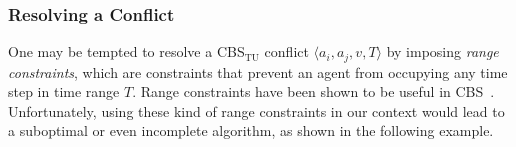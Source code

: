 \documentclass[jair,twoside,11pt,theapa]{article}
\newcommand{\tuple}[1]{\langle#1\rangle}
\newcommand{\sourcetargets}{\mathcal{S}}
\newcommand{\cbstu}{CBS$\mathrm{_{TU}}$\xspace}
\begin{document}


\subsubsection{Resolving a Conflict}

One may be tempted to resolve a \cbstu conflict $\tuple{a_i,a_j,v,T}$ by imposing \emph{range constraints}, which are constraints that prevent an agent from occupying any time step in time range $T$.
Range constraints have been shown to be useful in CBS~. 
Unfortunately, using these kind of range constraints in our context would lead to a suboptimal or even incomplete algorithm, as shown in the following example.



\end{document}
